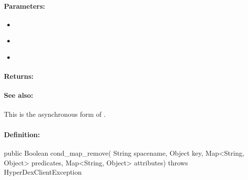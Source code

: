 \paragraph{Parameters:}
\begin{itemize}[noitemsep]
\item {}\\

\item {}\\

\item {}\\

\end{itemize}

\paragraph{Returns:}


\paragraph{See also:}  This is the asynchronous form of .

\pagebreak
\subsubsection{}
\label{api:java:cond_map_remove}


\paragraph{Definition:}
\begin{javacode}
public Boolean cond_map_remove(
        String spacename,
        Object key,
        Map<String, Object> predicates,
        Map<String, Object> attributes) throws HyperDexClientException
\end{javacode}


